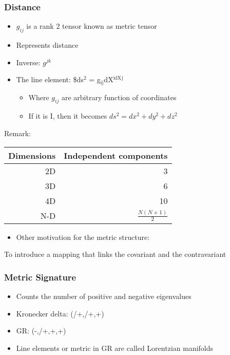 \documentclass[11pt]{article}
\begin{document}
\subsubsection{Distance}
\label{sec:org25aa65d}
\begin{itemize}
\item \(g_{ij}\) is a rank 2 tensor known as metric tensor
\item Represents distance
\item Inverse: \(g^{jk}\)
\item The line element: \$ds\(^{\text{2}}\) = g\(_{\text{ij}}\)dX\(^{\text{idX}}\)\(^{\text{j}}\)
\begin{itemize}
\item Where \(g_{ij}\) are arbitrary function of coordinates
\item If it is I, then it becomes \(ds^2 = dx^2+dy^2+dz^2\)
\end{itemize}
\end{itemize}
Remark:
\begin{center}
\begin{tabular}{rr}
Dimensions & Independent components\\
\hline
2D & 3\\
3D & 6\\
4D & 10\\
N-D & \(\frac{N(N+1)}{2}\)\\
\end{tabular}
\end{center}
\begin{itemize}
\item Other motivation for the metric structure:
\end{itemize}
To introduce a mapping that links the covariant and the contravariant
\subsubsection{Metric Signature}
\label{sec:org56dc25d}
\begin{itemize}
\item Counts the number of positive and negative eigenvalues
\item Kronecker delta: (/+,/+,+)
\item GR: (-,/+,+,+)
\item Line elements or metric in GR are called Lorentzian manifolds
\end{itemize}
\end{document}
